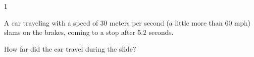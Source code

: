 
\AddToShipoutPicture*{\BackgroundPic}

\addtocounter {ProbNum} {1}

 
{\bf \Large{}} A car traveling with a speed of 30 meters per second (a little more than 60 mph) slams on the brakes, coming to a stop after 5.2 seconds.   \bigskip

How far did the car travel during the slide?\paragraph{}
\noindent
\vfill




\newpage